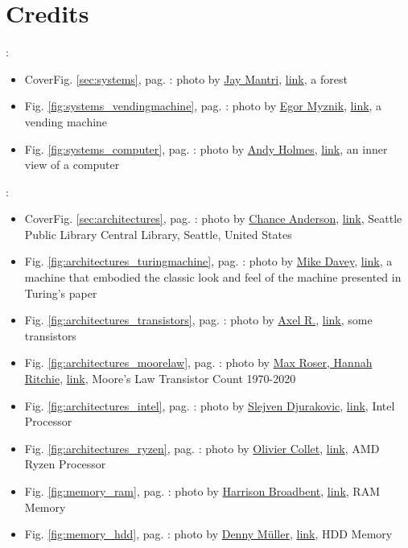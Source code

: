 \section[Credits]{Credits}
\label{sec:credits}
 

\newcommand{\photoref}[4]{Fig. \ref{#1}, pag. \pageref{#1}: photo by \href{#3}{#2}, \href{#4}{link}}

\begin{frame}

	\textbf{}:
	\begin{itemize}
		\item Cover\photoref{sec:systems}{Jay Mantri}{https://jaymantri.com/}{https://jaymantri.com/post/104375101928/download}, a forest
		\item \photoref{fig:systems_vendingmachine}{Egor Myznik}{https://unsplash.com/it/@vonshnauzer}{https://unsplash.com/it/foto/DRs9XsNlAZw}, a vending machine
		\item \photoref{fig:systems_computer}{Andy Holmes}{https://unsplash.com/it/@andyjh07}{https://unsplash.com/it/foto/EOAKUQcsFIU}, an inner view of a computer
	\end{itemize}
	
	
	\textbf{}:
	\begin{itemize}
		\item Cover\photoref{sec:architectures}{Chance Anderson}{https://unsplash.com/it/@chanceanderson}{https://unsplash.com/it/foto/if2coegqwZU}, Seattle Public Library Central Library, Seattle, United States
		\item \photoref{fig:architectures_turingmachine}{Mike Davey}{https://aturingmachine.com/}{https://www.youtube.com/watch?v=E3keLeMwfHY}, a machine that embodied the classic look and feel of the machine presented in Turing’s paper
		\item \photoref{fig:architectures_transistors}{Axel R.}{https://unsplash.com/it/@trisolarian}{https://unsplash.com/it/foto/2jXSnvMRwbc}, some transistors
		
		\item \photoref{fig:architectures_moorelaw}{Max Roser, Hannah Ritchie}{https://commons.wikimedia.org/wiki/File:Moore\%27s_Law_Transistor_Count_1970-2020.png}{https://en.wikipedia.org/wiki/Moore\%27s_law\#/media/File:Moore's_Law_Transistor_Count_1970-2020.png}, Moore's Law Transistor Count 1970-2020
		\item \photoref{fig:architectures_intel}{Slejven Djurakovic}{https://unsplash.com/it/@slavudin}{https://unsplash.com/it/foto/0uXzoEzYZ4I}, Intel Processor
		\item \photoref{fig:architectures_ryzen}{Olivier Collet}{https://unsplash.com/it/@ocollet}{https://unsplash.com/it/foto/JMwCe3w7qKk}, AMD Ryzen Processor
		\item \photoref{fig:memory_ram}{Harrison Broadbent}{https://unsplash.com/it/@harrisonbroadbent}{https://unsplash.com/it/foto/ING1Uf1Fc30}, RAM Memory
		\item \photoref{fig:memory_hdd}{Denny Müller}{https://unsplash.com/it/@redaquamedia}{https://unsplash.com/it/foto/1qL31aacAPA}, HDD Memory
		

\end{itemize}
\end{frame}
